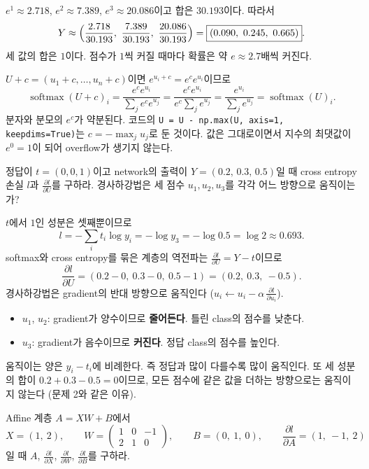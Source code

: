 \documentclass[11pt,a4paper]{article}
\newcommand{\pd}[2]{\frac{\partial #1}{\partial #2}}
\newcommand{\softmax}{\operatorname{softmax}}
\begin{document}
\begin{problems}
\begin{sol}
$e^1\approx2.718$, $e^2\approx7.389$, $e^3\approx20.086$이고 합은 $30.193$이다. 따라서
\[
Y\approx\Bigl(\frac{2.718}{30.193},\ \frac{7.389}{30.193},\ \frac{20.086}{30.193}\Bigr)
=\boxed{(0.090,\ 0.245,\ 0.665)}.
\]
세 값의 합은 $1$이다. 점수가 $1$씩 커질 때마다 확률은 약 $e\approx2.7$배씩 커진다.

$U+c=(u_1+c,\ldots,u_n+c)$이면 $e^{u_i+c}=e^c e^{u_i}$이므로
\[
\softmax(U+c)_i=\frac{e^{c}e^{u_i}}{\sum_{j}e^{c}e^{u_j}}
=\frac{e^{c}e^{u_i}}{e^{c}\sum_{j}e^{u_j}}
=\frac{e^{u_i}}{\sum_{j}e^{u_j}}=\softmax(U)_i .
\]
분자와 분모의 $e^c$가 약분된다.
코드의 \texttt{U = U - np.max(U, axis=1, keepdims=True)}는 $c=-\max_j u_j$로 둔 것이다.
값은 그대로이면서 지수의 최댓값이 $e^0=1$이 되어 overflow가 생기지 않는다.
\end{sol}

\item 정답이 $t=(0,0,1)$이고 network의 출력이 $Y=(0.2,\,0.3,\,0.5)$일 때
cross entropy 손실 $l$과 $\pd{l}{U}$를 구하라.
경사하강법은 세 점수 $u_1,u_2,u_3$를 각각 어느 방향으로 움직이는가?

\begin{sol}
$t$에서 $1$인 성분은 셋째뿐이므로
\[
l=-\sum_i t_i\log y_i=-\log y_3=-\log0.5=\log2\approx\boxed{0.693}.
\]
softmax와 cross entropy를 묶은 계층의 역전파는 $\pd{l}{U}=Y-t$이므로
\[
\pd{l}{U}=(0.2-0,\ 0.3-0,\ 0.5-1)=\boxed{(0.2,\ 0.3,\ -0.5)}.
\]
경사하강법은 gradient의 반대 방향으로 움직인다 ($u_i\leftarrow u_i-\alpha\,\pd{l}{u_i}$).
\begin{itemize}[leftmargin=1.5em,itemsep=0pt]
\item $u_1$, $u_2$: gradient가 양수이므로 \textbf{줄어든다}. 틀린 class의 점수를 낮춘다.
\item $u_3$: gradient가 음수이므로 \textbf{커진다}. 정답 class의 점수를 높인다.
\end{itemize}
움직이는 양은 $y_i-t_i$에 비례한다. 즉 정답과 많이 다를수록 많이 움직인다.
또 세 성분의 합이 $0.2+0.3-0.5=0$이므로, 모든 점수에 같은 값을 더하는 방향으로는 움직이지 않는다 (문제 2와 같은 이유).
\end{sol}

\item Affine 계층 $A=XW+B$에서
\[
X=(1,\ 2),\qquad
W=\begin{pmatrix}1&0&-1\\2&1&0\end{pmatrix},\qquad
B=(0,\ 1,\ 0),\qquad
\pd{l}{A}=(1,\ -1,\ 2)
\]
일 때 $A$, $\pd{l}{X}$, $\pd{l}{W}$, $\pd{l}{B}$를 구하라.


\end{problems}
\end{document}
